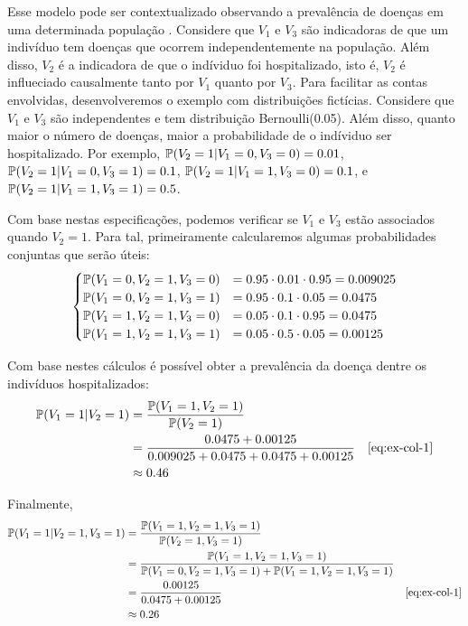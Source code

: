 Esse modelo pode ser contextualizado observando
a prevalência de doenças em uma determinada população 
\citep{Sackett1979}.
Considere que  $V_1$ e $V_3$ são 
indicadoras de que um indivíduo tem
doenças que ocorrem independentemente na população.
Além disso, $V_2$ é a indicadora de que 
o indíviduo foi hospitalizado, isto é,
$V_2$ é influeciado causalmente 
tanto por $V_1$ quanto por $V_3$.
Para facilitar as contas envolvidas,
desenvolveremos o exemplo com distribuições fictícias.
Considere que
$V_1$ e $V_3$ são independentes e
tem distribuição Bernoulli(0.05).
Além disso, quanto maior o número de doenças,
maior a probabilidade de o indíviduo ser hospitalizado.
Por exemplo,
$\P(V_2=1|V_1=0,V_3=0) = 0.01$,
$\P(V_2=1|V_1=0,V_3=1) = 0.1$,
$\P(V_2=1|V_1=1,V_3=0) = 0.1$, e
$\P(V_2=1|V_1=1,V_3=1) = 0.5$.

Com base nestas especificações, podemos
verificar se $V_1$ e $V_3$ estão associados
quando $V_2=1$. Para tal,
primeiramente calcularemos algumas
probabilidades conjuntas que serão úteis:
\begin{align}
 \label{eq:ex-col-1}
 \begin{cases}
  \P(V_1=0,V_2=1,V_3=0) &= 0.95 \cdot 0.01 \cdot 0.95 = 0.009025 \\
  \P(V_1=0,V_2=1,V_3=1) &= 0.95 \cdot 0.1 \cdot 0.05 = 0.0475 \\
  \P(V_1=1,V_2=1,V_3=0) &= 0.05 \cdot 0.1 \cdot 0.95 = 0.0475 \\
  \P(V_1=1,V_2=1,V_3=1) &= 0.05 \cdot 0.5 \cdot 0.05 = 0.00125
 \end{cases}
\end{align}

Com base nestes cálculos é possível obter
a prevalência da doença dentre os indivíduos hospitalizados:
\begin{align*}
 \P(V_1=1|V_2=1) 
 &= \frac{\P(V_1=1,V_2=1)}{\P(V_2=1)} \\
 &= \frac{0.0475 + 0.00125}{0.009025 + 0.0475 + 0.0475 + 0.00125} 
 & \text{\cref{eq:ex-col-1}} \\
 &\approx 0.46
\end{align*}

Finalmente,
\begin{align*}
 \P(V_1 = 1|V_2 = 1, V_3 = 1)
 &= \frac{\P(V_1=1,V_2=1,V_3=1)}{\P(V_2=1,V_3=1)} \\
 &= \frac{\P(V_1=1,V_2=1,V_3=1)}
 {\P(V_1=0,V_2=1,V_3=1) + \P(V_1=1,V_2=1,V_3=1)} \\
 &= \frac{0.00125}{0.0475 + 0.00125} & \text{\cref{eq:ex-col-1}} \\
 &\approx 0.26 
\end{align*}

